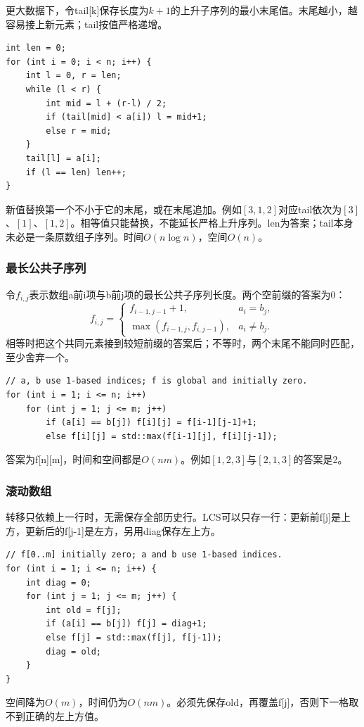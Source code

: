 \documentclass[UTF8,11pt,a4paper,fontset=none]{ctexart}
\begin{document}
更大数据下，令tail[k]保存长度为$k+1$的上升子序列的最小末尾值。末尾越小，越容易接上新元素；tail按值严格递增。
\par\noindent\begin{minipage}{\linewidth}
\begin{lstlisting}
int len = 0;
for (int i = 0; i < n; i++) {
    int l = 0, r = len;
    while (l < r) {
        int mid = l + (r-l) / 2;
        if (tail[mid] < a[i]) l = mid+1;
        else r = mid;
    }
    tail[l] = a[i];
    if (l == len) len++;
}
\end{lstlisting}
\end{minipage}\par
新值替换第一个不小于它的末尾，或在末尾追加。例如$[3,1,2]$对应tail依次为$[3]$、$[1]$、$[1,2]$。相等值只能替换，不能延长严格上升序列。len为答案；tail本身未必是一条原数组子序列。时间$O(n\log n)$，空间$O(n)$。
\subsubsection{最长公共子序列}
令$f_{i,j}$表示数组a前i项与b前j项的最长公共子序列长度。两个空前缀的答案为0：
\[
f_{i,j}=
\begin{cases}
f_{i-1,j-1}+1,&a_i=b_j,\\
\max(f_{i-1,j},f_{i,j-1}),&a_i\ne b_j.
\end{cases}
\]
相等时把这个共同元素接到较短前缀的答案后；不等时，两个末尾不能同时匹配，至少舍弃一个。
\par\noindent\begin{minipage}{\linewidth}
\begin{lstlisting}
// a, b use 1-based indices; f is global and initially zero.
for (int i = 1; i <= n; i++)
    for (int j = 1; j <= m; j++)
        if (a[i] == b[j]) f[i][j] = f[i-1][j-1]+1;
        else f[i][j] = std::max(f[i-1][j], f[i][j-1]);
\end{lstlisting}
\end{minipage}\par
答案为f[n][m]，时间和空间都是$O(nm)$。例如$[1,2,3]$与$[2,1,3]$的答案是2。
\subsubsection{滚动数组}
转移只依赖上一行时，无需保存全部历史行。LCS可以只存一行：更新前f[j]是上方，更新后的f[j-1]是左方，另用diag保存左上方。
\par\noindent\begin{minipage}{\linewidth}
\begin{lstlisting}
// f[0..m] initially zero; a and b use 1-based indices.
for (int i = 1; i <= n; i++) {
    int diag = 0;
    for (int j = 1; j <= m; j++) {
        int old = f[j];
        if (a[i] == b[j]) f[j] = diag+1;
        else f[j] = std::max(f[j], f[j-1]);
        diag = old;
    }
}
\end{lstlisting}
\end{minipage}\par
空间降为$O(m)$，时间仍为$O(nm)$。必须先保存old，再覆盖f[j]，否则下一格取不到正确的左上方值。
\end{document}
